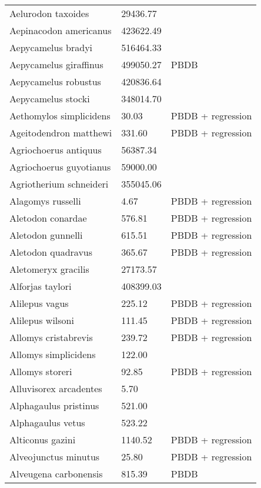 \documentclass{article}
\begin{document}
\begin{center}
\begin{longtable}{p{} p{} p{} }
  Aelurodon taxoides & 29436.77 & \cite{Tomiya2013} \\ 
  Aepinacodon americanus & 423622.49 & \cite{Baskin2011} \\ 
  Aepycamelus bradyi & 516464.33 & \cite{Dawson2012} \\ 
  Aepycamelus giraffinus & 499050.27 & PBDB \\ 
  Aepycamelus robustus & 420836.64 & \cite{Tomiya2013} \\ 
  Aepycamelus stocki & 348014.70 & \cite{Tomiya2013} \\ 
  Aethomylos simplicidens & 30.03 & PBDB + regression \\ 
  Ageitodendron matthewi & 331.60 & PBDB + regression \\ 
  Agriochoerus antiquus & 56387.34 & \cite{Tomiya2013} \\ 
  Agriochoerus guyotianus & 59000.00 & \cite{McKenna2011} \\ 
  Agriotherium schneideri & 355045.06 & \cite{Tomiya2013} \\ 
  Alagomys russelli & 4.67 & PBDB + regression \\ 
  Aletodon conardae & 576.81 & PBDB + regression \\ 
  Aletodon gunnelli & 615.51 & PBDB + regression \\ 
  Aletodon quadravus & 365.67 & PBDB + regression \\ 
  Aletomeryx gracilis & 27173.57 & \cite{Tomiya2013} \\ 
  Alforjas taylori & 408399.03 & \cite{Tomiya2013} \\ 
  Alilepus vagus & 225.12 & PBDB + regression \\ 
  Alilepus wilsoni & 111.45 & PBDB + regression \\ 
  Allomys cristabrevis & 239.72 & PBDB + regression \\ 
  Allomys simplicidens & 122.00 & \cite{McKenna2011} \\ 
  Allomys storeri & 92.85 & PBDB + regression \\ 
  Alluvisorex arcadentes & 5.70 & \cite{Tomiya2013} \\ 
  Alphagaulus pristinus & 521.00 & \cite{McKenna2011} \\ 
  Alphagaulus vetus & 523.22 & \cite{Tomiya2013} \\ 
  Alticonus gazini & 1140.52 & PBDB + regression \\ 
  Alveojunctus minutus & 25.80 & PBDB + regression \\ 
  Alveugena carbonensis & 815.39 & PBDB \\ 

\end{longtable}
\end{center}
\end{document}
